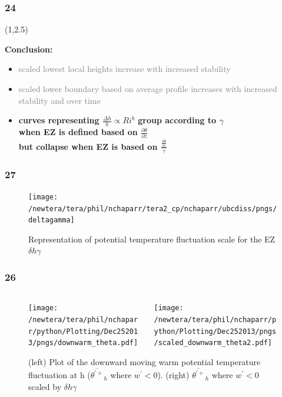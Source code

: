 \documentclass{beamer}
\newcommand\FrameText[1]{
\begin{textblock}{16}(1,2.5)
\raggedright #1
\end{textblock}}
\begin{document}
\begin{frame}
\frametitle{24}
\FrameText{\bf{\large Conclusion}:
\vspace{5mm}
\begin{itemize}
\item \textcolor{gray}{scaled lowest local heights increase with increased stability}
\vspace{5mm}
\item \textcolor{gray}{scaled lower boundary based on average profile increases with increased stability and over time}
\vspace{5mm}
\item \bf{\large curves representing  $\frac{\Delta h}{h} \propto Ri ^{b}$ group according to $\gamma$\\
when EZ is defined based on $\frac{\partial \overline{\theta}}{\partial z}$\\
but collapse when EZ is based on $\frac{\frac{\partial \overline{\theta}}{\partial z}}{\gamma}$} 
\end{itemize}
}
\end{frame}


\begin{frame}
\frametitle{27}
\fontsize{12pt}{7.2}\selectfont
\begin{figure}
\texttt{[image: /newtera/tera/phil/nchaparr/tera2\_cp/nchaparr/ubcdiss/pngs/deltagamma]}
\caption{Representation of potential temperature fluctuation scale for the EZ $\delta h \gamma$}
\end{figure}
\end{frame}


\begin{frame}
\fontsize{12pt}{7.2}\selectfont
\frametitle{26}
\begin{figure}
\begin{columns}[T]
   \begin{column}{.5\textwidth}
   \texttt{[image: /newtera/tera/phil/nchaparr/python/Plotting/Dec252013/pngs/downwarm\_theta.pdf]} 
   \end{column} 
   
   \begin{column}{.5\textwidth}
    \texttt{[image: /newtera/tera/phil/nchaparr/python/Plotting/Dec252013/pngs/scaled\_downwarm\_theta2.pdf]}
   \end{column}     
\end{columns}
\caption{(left) Plot of the downward moving warm potential temperature fluctuation at h ($\overline{\theta^{'+}}_{h}$ where $w^{'}<0$). (right) $\overline{\theta^{'+}}_{h}$ where $w^{'}<0$ scaled by $\delta h \gamma$}
\end{figure}
\end{frame}
\end{document}
